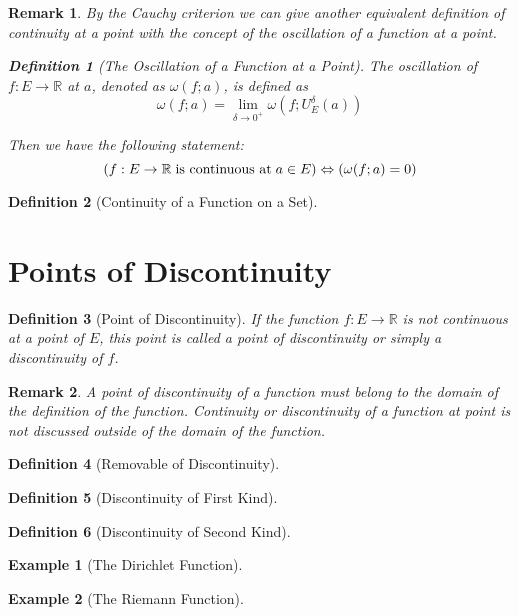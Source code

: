 \documentclass[onecolumn]{ctexart}
\newtheorem{definition}{Definition}
\newtheorem{remark}{Remark}
\newtheorem{example}{Example}
\begin{document}
\begin{remark}
  By the Cauchy criterion we can give another equivalent definition of 
  continuity at a point with the concept of the oscillation of a function at a 
  point.
  \begin{definition}[The Oscillation of a Function at a Point]
    The oscillation of $f:E \to \mathbb{R}$ at $a$, denoted as $\omega(f;a)$, is defined as
    \begin{equation}
      \omega(f;a) = \lim_{\delta \to 0^+} \omega(f;U_E^\delta(a))
    \end{equation}
  \end{definition}
  Then we have the following statement:
  \[
    (f:E \to \mathbb{R} \thickspace \textnormal{is continuous at} \thickspace a \in E) \Leftrightarrow
    (\omega(f;a) = 0)
  \]
\end{remark}

\begin{definition}[Continuity of a Function on a Set]
  
\end{definition}

\section{Points of Discontinuity}

\begin{definition}[Point of Discontinuity]
  If the function $f: E \to \mathbb{R}$ is not continuous at a point of $E$, 
  this point is called a point of discontinuity or simply a discontinuity of $f$.
\end{definition}
\begin{remark}
  A point of discontinuity of a function must belong to the domain of the 
  definition of the function. Continuity or discontinuity of a function at point 
  is not discussed outside of the domain of the function.
\end{remark}

\begin{definition}[Removable of Discontinuity]
  
\end{definition}

\begin{definition}[Discontinuity of First Kind]
  
\end{definition}

\begin{definition}[Discontinuity of Second Kind]
  
\end{definition}

\begin{example}[The Dirichlet Function]
  
\end{example}

\begin{example}[The Riemann Function]
  
\end{example}
\end{document}
